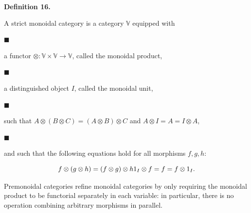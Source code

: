 \documentclass[10pt,a4paper]{article}
\begin{document}
 
 
\par\medskip\noindent\textbf{Definition 16.}\par
 
 
A strict monoidal category is a category $\mathbb{V}$ equipped with\par
  
\par\noindent  $\blacksquare$ 
 
a functor $\otimes:\mathbb{V}\times\mathbb{V}\to\mathbb{V}$, called the monoidal product,\par
 
 
 
\par\noindent  $\blacksquare$ 
 
a distinguished object $I$, called the monoidal unit,\par
 
 
 
\par\noindent  $\blacksquare$ 
 
such that $A\otimes(B\otimes C)=(A\otimes B)\otimes C$ and $A\otimes I=A=I\otimes A$,\par
 
 
 
\par\noindent  $\blacksquare$ 
 
and such that the following equations hold for all morphisms $f,g,h$:\par
    \[f\otimes(g\otimes h)=(f\otimes g)\otimes h\\
1_{I}\otimes f=f=f\otimes 1_{I}.\]    
 
  
 
 
 
Premonoidal categories refine monoidal categories by only requiring the monoidal product to be functorial separately in each variable: in particular, there is no operation combining arbitrary morphisms in parallel.\par
 
 
 
\end{document}

